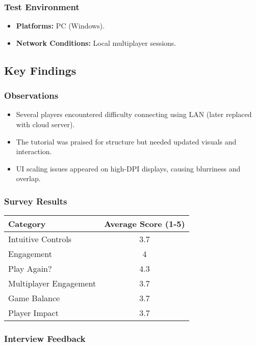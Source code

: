 \documentclass{article}
\begin{document}
\subsubsection{Test Environment}
\begin{itemize}
    \item \textbf{Platforms:} PC (Windows).
    \item \textbf{Network Conditions:} Local multiplayer sessions.
\end{itemize}

\subsection{Key Findings}

\subsubsection{Observations}
\begin{itemize}
    \item Several players encountered difficulty connecting using LAN (later replaced with cloud server).
    \item The tutorial was praised for structure but needed updated visuals and interaction.
    \item UI scaling issues appeared on high-DPI displays, causing blurriness and overlap.
\end{itemize}


\subsubsection{Survey Results}
\begin{longtable}{|p{7cm}|c|}
\hline
\textbf{Category} & \textbf{Average Score (1-5)} \\
\hline
Intuitive Controls & 3.7 \\
\hline
Engagement & 4 \\
\hline
Play Again? & 4.3 \\
\hline
Multiplayer Engagement & 3.7 \\
\hline
Game Balance & 3.7 \\
\hline
Player Impact & 3.7 \\
\hline
\end{longtable}

\subsubsection{Interview Feedback}
\end{document}
